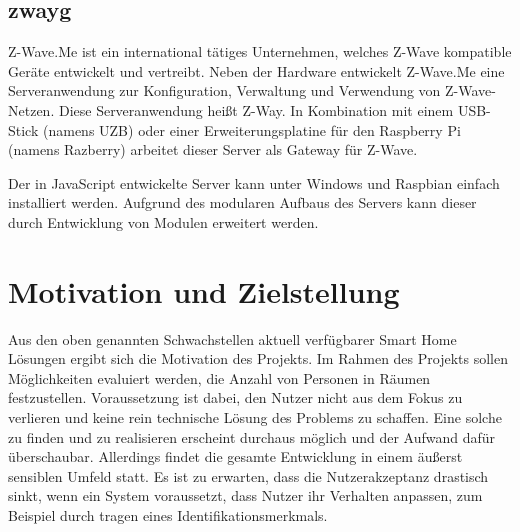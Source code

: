 \documentclass[12pt, oneside, smallheadings]{scrbook}
\begin{document}
\subsection{\gls{zwayg}}

Z-Wave.Me ist ein international tätiges Unternehmen, welches Z-Wave kompatible Geräte entwickelt und vertreibt. Neben der Hardware entwickelt Z-Wave.Me eine Serveranwendung zur Konfiguration, Verwaltung und Verwendung von Z-Wave-Netzen. Diese Serveranwendung heißt Z-Way. In Kombination mit einem USB-Stick (namens UZB) oder einer Erweiterungsplatine für den Raspberry Pi (namens Razberry) arbeitet dieser Server als Gateway für Z-Wave.

Der in JavaScript entwickelte Server kann unter Windows und Raspbian einfach installiert werden. Aufgrund des modularen Aufbaus des Servers kann dieser durch Entwicklung von Modulen erweitert werden.

\section{Motivation und Zielstellung}

Aus den oben genannten Schwachstellen aktuell verfügbarer Smart Home Lösungen ergibt sich die Motivation des Projekts. Im Rahmen des Projekts sollen Möglichkeiten evaluiert werden, die Anzahl von Personen in Räumen festzustellen.
Voraussetzung ist dabei, den Nutzer nicht aus dem Fokus zu verlieren und keine rein technische Lösung des Problems zu schaffen. Eine solche zu finden und zu realisieren erscheint durchaus möglich und der Aufwand dafür überschaubar. Allerdings findet die gesamte Entwicklung in einem äußerst sensiblen Umfeld statt. Es ist zu erwarten, dass die Nutzerakzeptanz drastisch sinkt, wenn ein System voraussetzt, dass Nutzer ihr Verhalten anpassen, zum Beispiel durch tragen eines Identifikationsmerkmals.
\end{document}
